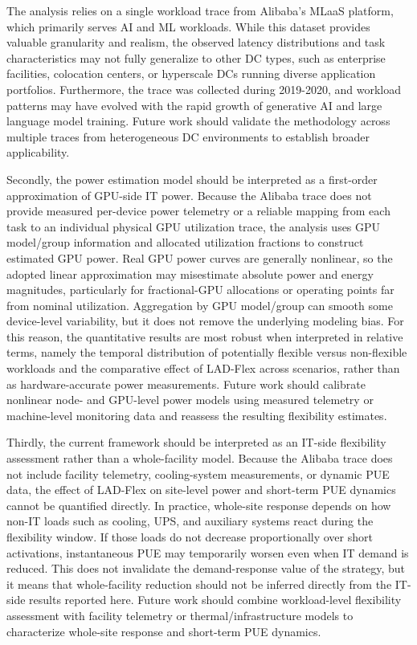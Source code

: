\documentclass[preprint,12pt]{elsarticle}
\begin{document}
The analysis relies on a single workload trace from Alibaba's MLaaS platform, which primarily serves AI and ML workloads. While this dataset provides valuable granularity and realism, the observed latency distributions and task characteristics may not fully generalize to other DC types, such as enterprise facilities, colocation centers, or hyperscale DCs running diverse application portfolios. Furthermore, the trace was collected during 2019-2020, and workload patterns may have evolved with the rapid growth of generative AI and large language model training. Future work should validate the methodology across multiple traces from heterogeneous DC environments to establish broader applicability.

Secondly, the power estimation model should be interpreted as a first-order approximation of GPU-side IT power. Because the Alibaba trace does not provide measured per-device power telemetry or a reliable mapping from each task to an individual physical GPU utilization trace, the analysis uses GPU model/group information and allocated utilization fractions to construct estimated GPU power. Real GPU power curves are generally nonlinear, so the adopted linear approximation may misestimate absolute power and energy magnitudes, particularly for fractional-GPU allocations or operating points far from nominal utilization. Aggregation by GPU model/group can smooth some device-level variability, but it does not remove the underlying modeling bias. For this reason, the quantitative results are most robust when interpreted in relative terms, namely the temporal distribution of potentially flexible versus non-flexible workloads and the comparative effect of LAD-Flex across scenarios, rather than as hardware-accurate power measurements. Future work should calibrate nonlinear node- and GPU-level power models using measured telemetry or machine-level monitoring data and reassess the resulting flexibility estimates.

Thirdly, the current framework should be interpreted as an IT-side flexibility assessment rather than a whole-facility model. Because the Alibaba trace does not include facility telemetry, cooling-system measurements, or dynamic PUE data, the effect of LAD-Flex on site-level power and short-term PUE dynamics cannot be quantified directly. In practice, whole-site response depends on how non-IT loads such as cooling, UPS, and auxiliary systems react during the flexibility window. If those loads do not decrease proportionally over short activations, instantaneous PUE may temporarily worsen even when IT demand is reduced. This does not invalidate the demand-response value of the strategy, but it means that whole-facility reduction should not be inferred directly from the IT-side results reported here. Future work should combine workload-level flexibility assessment with facility telemetry or thermal/infrastructure models to characterize whole-site response and short-term PUE dynamics.
\end{document}
